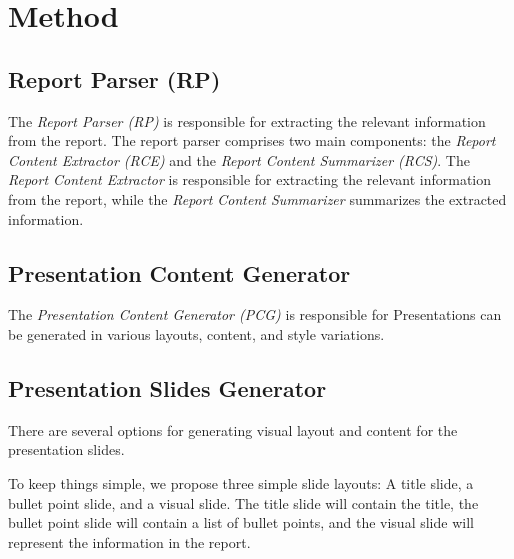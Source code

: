 \section{Method}

\subsection{Report Parser (RP)}
The \emph{Report Parser (RP)} is responsible for extracting the relevant information from the report. The report parser comprises two main components: the \emph{Report Content Extractor (RCE)} and the \emph{Report Content Summarizer (RCS)}. The \emph{Report Content Extractor} is responsible for extracting the relevant information from the report, while the \emph{Report Content Summarizer} summarizes the extracted information.

\subsection{Presentation Content Generator}
The \emph{Presentation Content Generator (PCG)} is responsible for 
Presentations can be generated in various layouts, content, and style variations. 

\subsection{Presentation Slides Generator}
There are several options for generating visual layout and content for the presentation slides. 

To keep things simple, we propose three simple slide layouts: A title slide, a bullet point slide, and a visual slide. The title slide will contain the title, the bullet point slide will contain a list of bullet points, and the visual slide will represent the information in the report.

